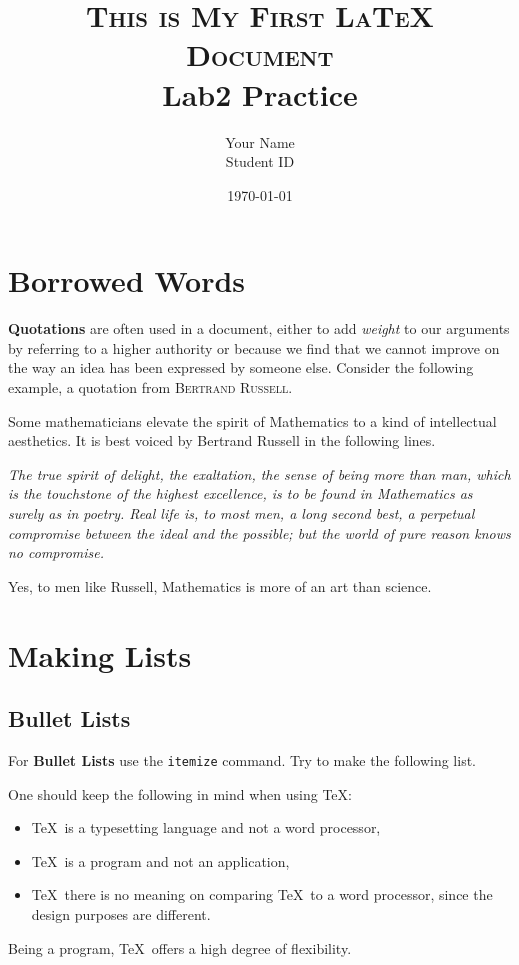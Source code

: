 \documentclass[a4paper,11pt]{article}
\begin{document}
\title{\textsc{This is My First LaTeX Document} \\ \small Lab2 Practice}
\author{\Large{Your Name} \\ \small Student ID}
\date{\today}
\maketitle

\section{Borrowed Words}

\textbf{Quotations} are often used in a document, either to add \textit{weight} to our arguments by referring to a higher authority or because we find that we cannot improve on the way an idea has been expressed by someone else. Consider the following example, a quotation from \textsc{Bertrand Russell}.

Some mathematicians elevate the spirit of Mathematics to a kind of intellectual aesthetics. It is best voiced by Bertrand Russell in the following lines.

\textit{
The true spirit of delight, the exaltation, the sense of being more than man, which is the touchstone of the highest excellence, is to be found in Mathematics as surely as in poetry. Real life is, to most men, a long second best, a perpetual compromise between the ideal and the possible; but the world of pure reason knows no compromise.}

Yes, to men like Russell, Mathematics is more of an art than science.

\newpage
\section{Making Lists}

\subsection{Bullet Lists}

For \textbf{Bullet Lists} use the \texttt{itemize} command. Try to make the following list.

One should keep the following in mind when using \TeX:
\begin{itemize}
\item \TeX\,  is a typesetting language and not a word processor,
\item \TeX \, is a program and not an application,
\item \TeX \, there is no meaning on comparing \TeX \, to a word processor, since the design purposes are different.
\end{itemize}
Being a program, \TeX \, offers a high degree of flexibility.
\end{document}
